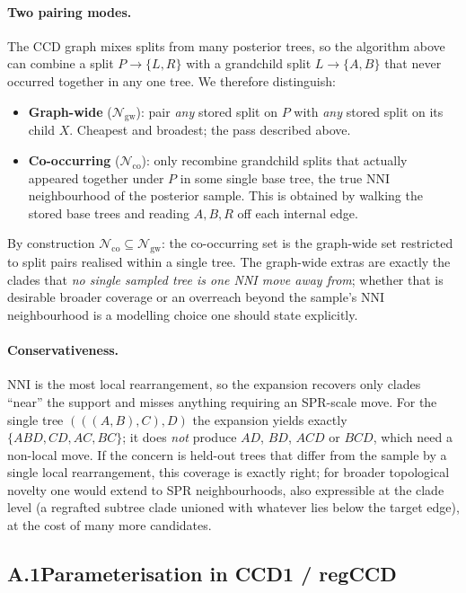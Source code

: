 \documentclass{article}
\newcommand{\NN}{\mathcal{N}}
\begin{document}
\paragraph{Two pairing modes.}
The CCD graph mixes splits from many posterior trees, so the algorithm above can
combine a split $P\to\{L,R\}$ with a grandchild split $L\to\{A,B\}$ that never
occurred together in any one tree. We therefore distinguish:
\begin{itemize}
  \item \textbf{Graph-wide} ($\NN_{\mathrm{gw}}$): pair \emph{any} stored split on
    $P$ with \emph{any} stored split on its child $X$. Cheapest and broadest; the
    pass described above.
  \item \textbf{Co-occurring} ($\NN_{\mathrm{co}}$): only recombine grandchild
    splits that actually appeared together under $P$ in some single base tree,
    the true NNI neighbourhood of the posterior sample. This is obtained by
    walking the stored base trees and reading $A,B,R$ off each internal edge.
\end{itemize}
By construction $\NN_{\mathrm{co}}\subseteq\NN_{\mathrm{gw}}$: the co-occurring
set is the graph-wide set restricted to split pairs realised within a single
tree. The graph-wide extras are exactly the clades that \emph{no single sampled
tree is one NNI move away from}; whether that is desirable broader coverage or an
overreach beyond the sample's NNI neighbourhood is a modelling choice one should
state explicitly.

\paragraph{Conservativeness.}
NNI is the most local rearrangement, so the expansion recovers only clades
``near'' the support and misses anything requiring an SPR-scale move. For the
single tree $(((A,B),C),D)$ the expansion yields exactly $\{ABD, CD, AC, BC\}$;
it does \emph{not} produce $AD$, $BD$, $ACD$ or $BCD$, which need a non-local
move. If the concern is held-out trees that differ from the sample by a single
local rearrangement, this coverage is exactly right; for broader topological
novelty one would extend to SPR neighbourhoods, also expressible at the clade
level (a regrafted subtree clade unioned with whatever lies below the target
edge), at the cost of many more candidates.

\subsection*{A.1\quad Parameterisation in CCD1 / regCCD}
\end{document}

